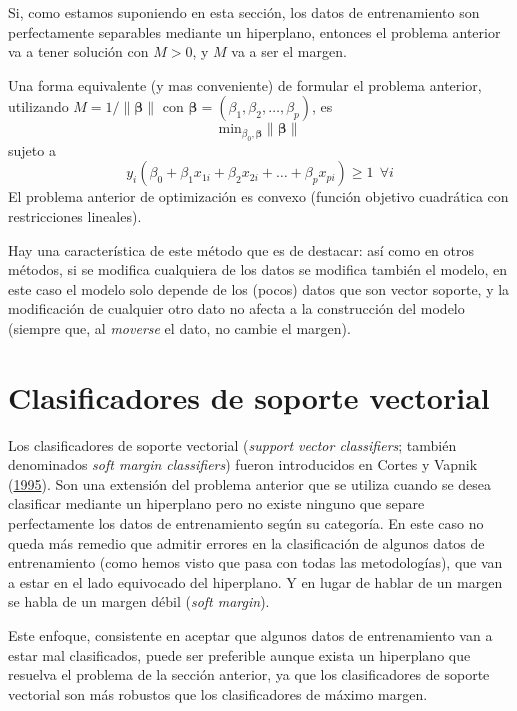 \documentclass[
]{book}
\theoremstyle{break}
\theoremstyle{nonumberplain}
\begin{document}
Si, como estamos suponiendo en esta sección, los datos de entrenamiento son perfectamente separables mediante un hiperplano, entonces el problema anterior va a tener solución con \(M>0\), y \(M\) va a ser el margen.

Una forma equivalente (y mas conveniente) de formular el problema anterior, utilizando \(M = 1/\lVert \boldsymbol{\beta} \rVert\) con \(\boldsymbol{\beta} = (\beta_1, \beta_2, \ldots, \beta_p)\), es
\[\mbox{min}_{\beta_0, \boldsymbol{\beta}} \lVert \boldsymbol{\beta} \rVert\]
sujeto a
\[ y_i(\beta_0 + \beta_1 x_{1i} + \beta_2 x_{2i} + \ldots + \beta_p x_{pi}) \ge 1 \ \ \forall i\]
El problema anterior de optimización es convexo (función objetivo cuadrática con restricciones lineales).

Hay una característica de este método que es de destacar: así como en otros métodos, si se modifica cualquiera de los datos se modifica también el modelo, en este caso el modelo solo depende de los (pocos) datos que son vector soporte, y la modificación de cualquier otro dato no afecta a la construcción del modelo (siempre que, al \emph{moverse} el dato, no cambie el margen).

\hypertarget{clasificadores-de-soporte-vectorial}{%
\section{Clasificadores de soporte vectorial}\label{clasificadores-de-soporte-vectorial}}

Los clasificadores de soporte vectorial (\emph{support vector classifiers}; también denominados \emph{soft margin classifiers}) fueron introducidos en Cortes y Vapnik (\protect\hyperlink{ref-cortes1995support}{1995}). Son una extensión del problema anterior que se utiliza cuando se desea clasificar mediante un hiperplano pero no existe ninguno que separe perfectamente los datos de entrenamiento según su categoría. En este caso no queda más remedio que admitir errores en la clasificación de algunos datos de entrenamiento (como hemos visto que pasa con todas las metodologías), que van a estar en el lado equivocado del hiperplano. Y en lugar de hablar de un margen se habla de un margen débil (\emph{soft margin}).

Este enfoque, consistente en aceptar que algunos datos de entrenamiento van a estar mal clasificados, puede ser preferible aunque exista un hiperplano que resuelva el problema de la sección anterior, ya que los clasificadores de soporte vectorial son más robustos que los clasificadores de máximo margen.
\end{document}
